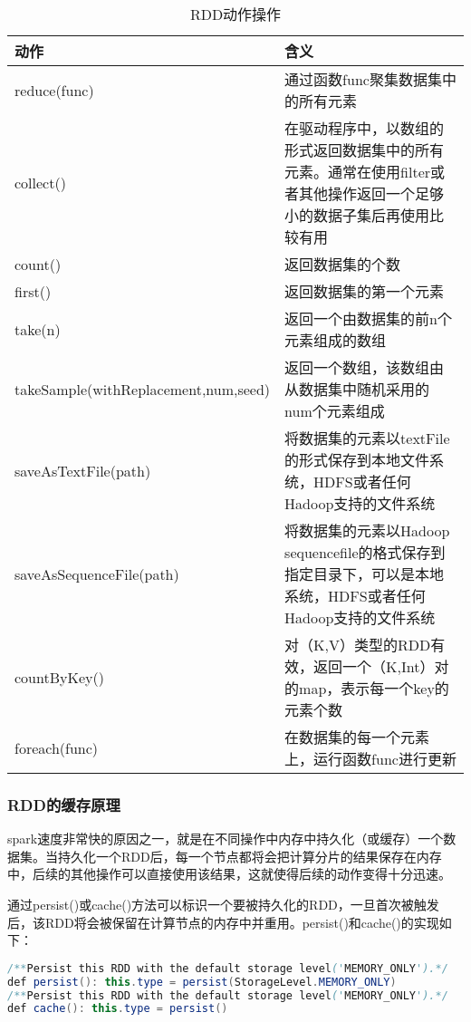 \begin{table}[h] %
\caption{RDD动作操作} %
\centering
\label{tab:action}
\begin{tabular}{p{6cm}|p{8cm}} %
\hline
\hline
动作  & 含义 \\ %
\hline %
reduce(func)  & 通过函数func聚集数据集中的所有元素\\
\hline
collect()  & 在驱动程序中，以数组的形式返回数据集中的所有元素。通常在使用filter或者其他操作返回一个足够小的数据子集后再使用比较有用\\
\hline
count()  & 返回数据集的个数\\
\hline
first() & 返回数据集的第一个元素\\
\hline
take(n) & 返回一个由数据集的前n个元素组成的数组\\
\hline
takeSample(withReplacement,num,seed) & 返回一个数组，该数组由从数据集中随机采用的num个元素组成\\
\hline
saveAsTextFile(path) & 将数据集的元素以textFile的形式保存到本地文件系统，HDFS或者任何Hadoop支持的文件系统\\
\hline
saveAsSequenceFile(path) & 将数据集的元素以Hadoop sequencefile的格式保存到指定目录下，可以是本地系统，HDFS或者任何Hadoop支持的文件系统\\
\hline
countByKey() & 对（K,V）类型的RDD有效，返回一个（K,Int）对的map，表示每一个key的元素个数\\
\hline
foreach(func) & 在数据集的每一个元素上，运行函数func进行更新\\
\hline
\hline
\end{tabular}
\end{table}

\subsubsection{RDD的缓存原理}
spark速度非常快的原因之一，就是在不同操作中内存中持久化（或缓存）一个数据集。当持久化一个RDD后，每一个节点都将会把计算分片的结果保存在内存中，后续的其他操作可以直接使用该结果，这就使得后续的动作变得十分迅速。

通过persist()或cache()方法可以标识一个要被持久化的RDD，一旦首次被触发后，该RDD将会被保留在计算节点的内存中并重用。persist()和cache()的实现如下：
\begin{lstlisting}[language=Java,numbers=none,frame=none]
/**Persist this RDD with the default storage level('MEMORY_ONLY').*/
def persist(): this.type = persist(StorageLevel.MEMORY_ONLY)
/**Persist this RDD with the default storage level('MEMORY_ONLY').*/
def cache(): this.type = persist()
\end{lstlisting}

